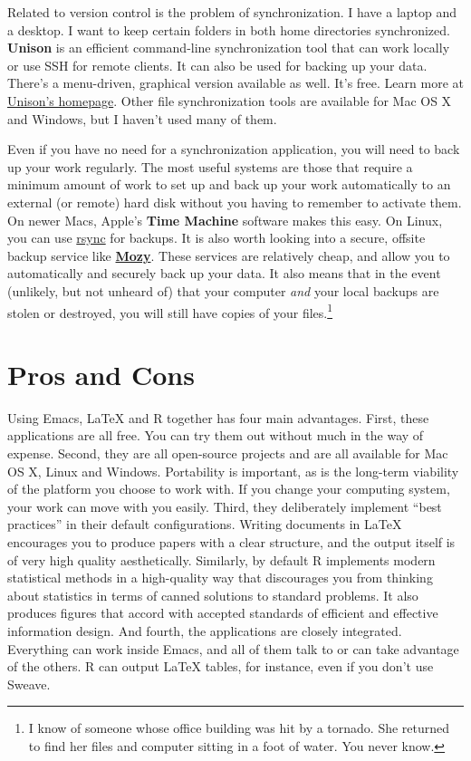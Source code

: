 \documentclass[11pt,article]{memoir}
\begin{document}
Related to version control is the problem of synchronization. I have a laptop and a desktop. I want to keep certain folders in both home directories synchronized. \textbf{Unison} is an efficient command-line synchronization tool that can work locally or use SSH for remote clients. It can also be used for backing up your data. There's a menu-driven, graphical version available as well. It's free. Learn more at \href{http://www.cis.upenn.edu/~bcpierce/unison/}{Unison's homepage}. Other file synchronization tools are available for Mac OS X and Windows, but I haven't used many of them. 

Even if you have no need for a synchronization application, you will need to back up your work regularly. The most useful systems are those that require a minimum amount of work to set up and back up your work automatically to an external (or remote) hard disk without you having to remember to activate them. On newer Macs, Apple's \textbf{Time Machine} software makes this easy. On Linux, you can use \href{http://www.psychocats.net/ubuntu/backup}{rsync} for backups. It is also  worth looking into a secure, offsite backup service like \href{http://mozy.com/}{\textbf{Mozy}}. These services are relatively cheap, and allow you to automatically and securely back up your data. It also means that in the event (unlikely, but not unheard of) that your computer \emph{and} your local backups are stolen or destroyed, you will still have copies of your files.\footnote{I know of someone whose office building was hit by a tornado. She returned to find her files and computer sitting in a foot of water. You never know.}

\section{Pros and Cons}  
Using Emacs, LaTeX and R together has four main advantages. First, these applications are all free. You can try them out without much in the way of expense. Second, they are all open-source projects and are all available for Mac OS X, Linux and Windows. Portability is important, as is the long-term viability of the platform you choose to work with. If you change your computing system, your work can move with you easily. Third, they deliberately implement ``best practices'' in their default configurations. Writing documents in LaTeX encourages you to produce papers with a clear structure, and the output itself is of very high quality aesthetically. Similarly, by default R implements modern statistical methods in a high-quality way that discourages you from thinking about statistics in terms of canned solutions to standard problems. It also produces figures that accord with accepted standards of efficient and effective information design. And fourth, the applications are closely integrated. Everything can work inside Emacs, and all of them talk to or can take advantage of the others. R can output LaTeX tables, for instance, even if you don't use Sweave.
\end{document}
